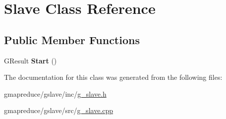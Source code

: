 \hypertarget{class_slave}{\section{Slave Class Reference}
\label{class_slave}
}
\subsection*{Public Member Functions}
\begin{DoxyCompactItemize}
\item 
\hypertarget{class_slave_a594124567c44c04f6d44968f81e2d08c}{G\-Result {\bfseries Start} ()}\label{class_slave_a594124567c44c04f6d44968f81e2d08c}

\end{DoxyCompactItemize}


The documentation for this class was generated from the following files\-:\begin{DoxyCompactItemize}
\item 
gmapreduce/gslave/inc/\hyperlink{g__slave_8h}{g\-\_\-slave.\-h}\item 
gmapreduce/gslave/src/\hyperlink{g__slave_8cpp}{g\-\_\-slave.\-cpp}\end{DoxyCompactItemize}
